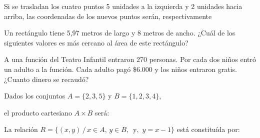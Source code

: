 \documentclass[letterpaper,10pt]{examdesign}
\begin{document}
\begin{multiplechoice}[rearrange=no,keycolumns=4,examcolumns=2]
\begin{block}
\begin{question}
Si se trasladan los cuatro puntos 5 unidades a la izquierda y 2 unidades hacia arriba, las coordenadas de los nuevos puntos serán, respectivamente
\end{question}
\end{block}
\begin{question}
Un rectángulo tiene 5,97 metros de largo y 8 metros de ancho. ¿Cuál de los siguientes valores es más cercano al área de este rectángulo?
\end{question}
\begin{question}
A una función del Teatro Infantil entraron 270 personas. Por cada dos niños entró un adulto a la función. Cada adulto pagó \$6.000 y los niños entraron gratis. ¿Cuanto dinero se recaudó?
    
\end{question}
\begin{block}
Dados los conjuntos $A=\{2,3,5\}$ y $B=\{1,2,3,4\}$,
\begin{question}
el producto cartesiano $A\times B$ ser\'{a}:
\end{question}
\begin{question}
La relación $R=\{(x,y)\,/\, x\in A,\, y\in B, \, \text{ y, } \, y=x-1 \} $ está constituída por:
\end{question}
\end{block}

\end{multiplechoice}
\end{document}
